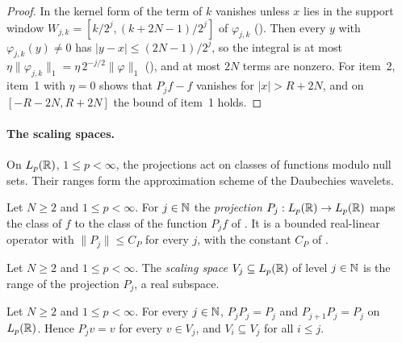 \begin{proof}
\leanok
{}
In the kernel form of  the term of $k$ vanishes unless $x$ lies in
the support window $W_{j,k} = [k/2^j, (k + 2N - 1)/2^j]$ of $\varphi_{j,k}$
(). Then every $y$ with $\varphi_{j,k}(y) \neq 0$ has
$|y - x| \leq (2N - 1)/2^j$, so the integral is at most
$\eta \|\varphi_{j,k}\|_1 = \eta \, 2^{-j/2} \|\varphi\|_1$ (),
and at most $2N$ terms are nonzero. For item~2, item~1 with $\eta = 0$ shows that
$P_j f - f$ vanishes for $|x| > R + 2N$, and on $[-R - 2N, R + 2N]$ the bound of item~1 holds.
\end{proof}

\paragraph{The scaling spaces.}
On $L_p(\mathbb{R})$, $1 \leq p < \infty$, the projections act on classes of functions modulo null sets.
Their ranges form the approximation scheme of the Daubechies wavelets.

\begin{definition}
\label{def:daub-proj}
\leanok
{}
Let $N \geq 2$ and $1 \leq p < \infty$. For $j \in \mathbb{N}$ the \emph{projection}
$P_j : L_p(\mathbb{R}) \to L_p(\mathbb{R})$ maps the class of $f$ to the class of the function $P_j f$ of
. It is a bounded real-linear operator with $\|P_j\| \leq C_P$ for
every $j$, with the constant $C_P$ of .
\end{definition}

\begin{definition}
\label{def:daub-scaling-space}
\leanok
{}
Let $N \geq 2$ and $1 \leq p < \infty$. The \emph{scaling space} $V_j \subseteq L_p(\mathbb{R})$ of level
$j \in \mathbb{N}$ is the range of the projection $P_j$, a real subspace.
\end{definition}

\begin{proposition}
\label{prop:daub-scaling-spaces}
\leanok
{}
Let $N \geq 2$ and $1 \leq p < \infty$. For every $j \in \mathbb{N}$, $P_j P_j = P_j$ and
$P_{j+1} P_j = P_j$ on $L_p(\mathbb{R})$. Hence $P_j v = v$ for every $v \in V_j$, and
$V_i \subseteq V_j$ for all $i \leq j$.
\end{proposition}

